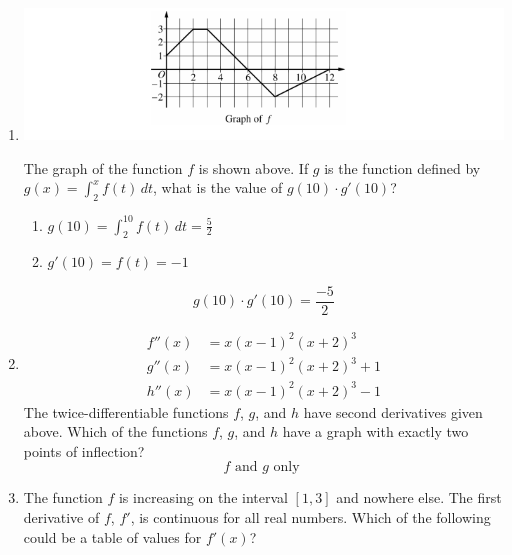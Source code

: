 \documentclass[12pt]{article}
\begin{document}
\begin{enumerate}
    \item 
        \begin{center}
            \includegraphics[width=5in]{FEP6.png}
        \end{center}
        The graph of the function $f$ is shown above. If $g$ is the function defined by $g(x)=\int_{2}^{x} f(t) \, dt$, what is the value of $g(10) \cdot g'(10)$?
        \begin{enumerate}
            \item $g(10) = \int_{2}^{10} f(t) \, dt = \frac{5}{2}$
            \item $g'(10)=f(t) = -1$
        \end{enumerate}
        $$g(10) \cdot g'(10) = \boxed{\frac{-5}{2}}$$
    \item 
    \begin{align*}
        f''(x) &= x(x-1)^2(x+2)^3\\
        g''(x) &= x(x-1)^2(x+2)^3 +1\\
        h''(x) &= x(x-1)^2(x+2)^3 -1
    \end{align*}
    The twice-differentiable functions $f$, $g$, and $h$ have second derivatives given above. Which of the functions $f$, $g$, and $h$ have a graph with exactly two points of inflection?
    $$\boxed{f \text{ and } g \text{ only }}$$
    \item The function $f$ is increasing on the interval $[1, 3]$ and nowhere else. The first derivative of $f$, $f'$, is continuous for all real numbers. Which of the following could be a table of values for $f'(x)$?
    \begin{center}

\end{center}
\end{enumerate}
\end{document}
